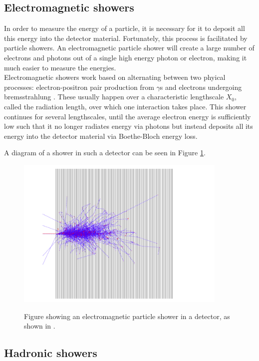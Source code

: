 \documentclass[12 pt]{article}
\begin{document}
		\subsection{Electromagnetic showers}\label{electroshowers}
			In order to measure the energy of a particle, it is necessary for it to deposit all this energy into the detector material. Fortunately, this process is facilitated by particle showers. An electromagnetic particle shower will create a large number of electrons and photons out of a single high energy photon or electron, making it much easier to measure the energies. \\

			Electromagnetic showers work based on alternating between two phyical processes: electron-positron pair production from $\gamma$s and electrons undergoing bremsstrahlung \cite{notes13}. These usually happen over a characteristic lengthscale $X_0$, called the radiation length, over which one interaction takes place. This shower continues for several lengthscales, until the average electron energy is sufficiently low such that it no longer radiates energy via photons but instead deposits all its energy into the detector material via Boethe-Bloch energy loss.

			A diagram of a shower in such a detector can be seen in Figure \ref{particle_shower}.
			\begin{figure}[H]
				\centering
				\includegraphics[width=0.9\textwidth]{particle_shower.png}
				\label{particle_shower}
				\caption{Figure showing an electromagnetic particle shower in a detector, as shown in \cite{notes13}.}
			\end{figure}

		\subsection{Hadronic showers}
\end{document}
